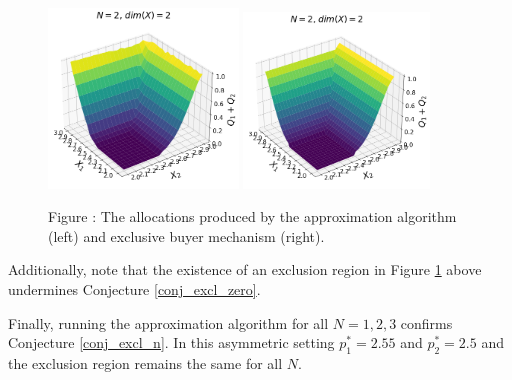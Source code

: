 \documentclass{article}
\newcounter{fig}
\begin{document}
\begin{figure}[H]
    \begin{center}
    \includegraphics[width=0.45\textwidth]{images/asymmetric_independent_truncnorm.png}
    \includegraphics[width=0.44\textwidth]{images/asymmetric_independent_truncnorm_ebm.png}
    \end{center}
    
    \vspace{1mm}
    \raggedright{\small {\sc Figure \thefig\label{fig:truncnorm_alloc}:} The allocations produced by the approximation algorithm (left) and exclusive buyer mechanism (right).} 
\end{figure}

\noindent Additionally, note that the existence of an exclusion region in Figure \ref{fig:truncnorm_alloc} above undermines Conjecture \ref{conj_excl_zero}.

Finally, running the approximation algorithm for all $N=1,2,3$ confirms Conjecture \ref{conj_excl_n}. In this asymmetric setting $p_1^* = 2.55$ and $p_2^* = 2.5$ and the exclusion region remains the same for all $N$. 

\end{document}
